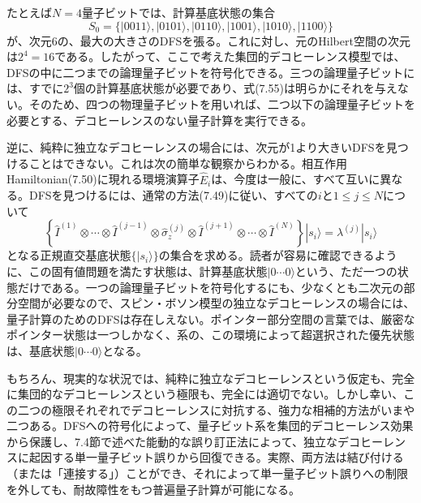 たとえば$N=4$量子ビットでは、計算基底状態の集合
\begin{equation}S_0=\{|0011\rangle,|0101\rangle,|0110\rangle,|1001\rangle,|1010\rangle,|1100\rangle\}\tag{7.55}\end{equation}
が、次元6の、最大の大きさのDFSを張る。これに対し、元のHilbert空間の次元は$2^4=16$である。したがって、ここで考えた集団的デコヒーレンス模型では、DFSの中に二つまでの論理量子ビットを符号化できる。三つの論理量子ビットには、すでに$2^3$個の計算基底状態が必要であり、式(7.55)は明らかにそれを与えない。そのため、四つの物理量子ビットを用いれば、二つ以下の論理量子ビットを必要とする、デコヒーレンスのない量子計算を実行できる。

逆に、純粋に独立なデコヒーレンスの場合には、次元が1より大きいDFSを見つけることはできない。これは次の簡単な観察からわかる。相互作用Hamiltonian(7.50)に現れる環境演算子$\hat E_i$は、今度は一般に、すべて互いに異なる。DFSを見つけるには、通常の方法(7.49)に従い、すべての$i$と$1\leq j\leq N$について
\hypertarget{srcpage:325}{}\label{srcpage:325}
\begin{equation}\left\{\hat I^{(1)}\otimes\cdots\otimes\hat I^{(j-1)}\otimes\hat\sigma_z^{(j)}\otimes\hat I^{(j+1)}\otimes\cdots\otimes\hat I^{(N)}\right\}|s_i\rangle=\lambda^{(j)}|s_i\rangle\tag{7.56}\end{equation}
となる正規直交基底状態$\{|s_i\rangle\}$の集合を求める。読者が容易に確認できるように、この固有値問題を満たす状態は、計算基底状態$|0\cdots0\rangle$という、ただ一つの状態だけである。一つの論理量子ビットを符号化するにも、少なくとも二次元の部分空間が必要なので、スピン・ボソン模型の独立なデコヒーレンスの場合には、量子計算のためのDFSは存在しえない。ポインター部分空間の言葉では、厳密なポインター状態は一つしかなく、系の、この環境によって超選択された優先状態は、基底状態$|0\cdots0\rangle$となる。

もちろん、現実的な状況では、純粋に独立なデコヒーレンスという仮定も、完全に集団的なデコヒーレンスという極限も、完全には適切でない。しかし幸い、この二つの極限それぞれでデコヒーレンスに対抗する、強力な相補的方法がいまや二つある。DFSへの符号化によって、量子ビット系を集団的デコヒーレンス効果から保護し、7.4節で述べた能動的な誤り訂正法によって、独立なデコヒーレンスに起因する単一量子ビット誤りから回復できる。実際、両方法は結び付ける（または「連接する」\cite{ref094}）ことができ、それによって単一量子ビット誤りへの制限を外しても、耐故障性をもつ普遍量子計算が可能になる\cite{ref095,ref373}。

